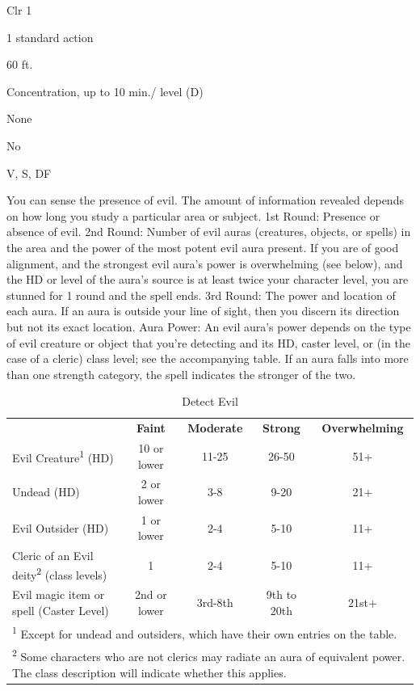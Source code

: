 
\begin{description*}
\item[Level:] Clr 1
\item[Casting Time:] 1 standard action
\item[Range:] 60 ft.
\item[Duration:] Concentration, up to 10 min./ level (D)
\item[Saving Throw:] None
\item[Spell Resistance:] No
\item[Components:] V, S, DF
\end{description*}

You can sense the presence of evil. The amount of information revealed depends
on how long you study a particular area or subject.
1st Round: Presence or absence of evil.
2nd Round: Number of evil auras (creatures, objects, or spells) in the
area and the power of the most potent evil aura present.
If you are of good alignment, and the strongest evil aura's power is overwhelming
(see below), and the HD or level of the aura's source is at least twice your character
level, you are stunned for 1 round and the spell ends.
3rd Round: The power and location of each aura. If an aura is outside
your line of sight, then you discern its direction but not its exact location.
Aura Power: An evil aura's power depends on the type of evil creature
or object that you're detecting and its HD, caster level, or (in the case of a
cleric) class level; see the accompanying table. If an aura falls into more than
one strength category, the spell indicates the stronger of the two.
\begin{table}[htb]
\caption{Detect Evil}
\centering
\begin{tabular}{l c c c c}
& \textbf{Faint} & \textbf{Moderate} & \textbf{Strong} & \textbf{Overwhelming}\\
Evil Creature\textsuperscript{1} (HD) & 10 or lower & 11-25 & 26-50 & 51+\\
Undead (HD) & 2 or lower & 3-8 & 9-20 & 21+\\
Evil Outsider (HD) & 1 or lower & 2-4 & 5-10 & 11+\\
Cleric of an Evil deity\textsuperscript{2} (class levels) & 1 & 2-4 & 5-10 & 11+\\
Evil magic item or spell (Caster Level) & 2nd or lower & 3rd-8th & 9th to 20th & 21st+\\
\multicolumn{5}{p{15cm}}{\textsuperscript{1} Except for undead and outsiders, which have their own entries on the table.}\\
\multicolumn{5}{p{15cm}}{\textsuperscript{2} Some characters who are not clerics may radiate an aura of equivalent power. The class description will indicate whether this applies.}\\
\end{tabular}
\end{table}
